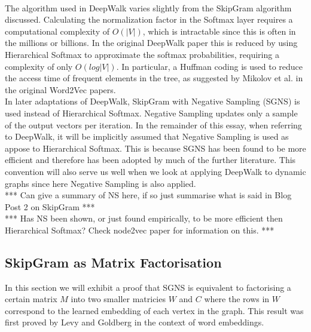 \documentclass[a4paper]{article}
\begin{document}
\\
The algorithm used in DeepWalk varies slightly from the SkipGram algorithm
discussed. Calculating the normalization factor in the Softmax layer requires a
computational complexity of $O(|V|)$, which is intractable since this is often
in the millions or billions. In the original DeepWalk paper this is
reduced by using Hierarchical Softmax to approximate the softmax probabilities,
requiring a complexity of only $O(log|V|)$. In particular, a Huffman coding is
used to reduce the access time of frequent elements in the tree, as suggested by
Mikolov et al. in the original Word2Vec
papers.\cite{mikolov2013efficient,mikolov2013distributed}\\
In later adaptations of DeepWalk, SkipGram with Negative Sampling (SGNS) is used instead of
Hierarchical Softmax. Negative Sampling updates only a sample of the output
vectors per iteration. In the remainder of this essay, when referring to DeepWalk, it will be
implicitly assumed that Negative Sampling is used as appose to Hierarchical
Softmax. This is because SGNS has been found to be more efficient
and therefore has been adopted by much of the further literature. This convention will also
serve us well when we look at applying DeepWalk to dynamic graphs since here
Negative Sampling is also applied.\\
*** Can give a summary of NS here, if so just summarise what is said in Blog
Post 2 on SkipGram ***\\
*** Has NS been shown, or just found empirically, to be more efficient then
Hierarchical Softmax? Check node2vec paper for information on this. ***\\
\subsection{SkipGram as Matrix Factorisation}
In this section we will exhibit a proof that SGNS is
equivalent to factorising a certain matrix $M$ into two smaller matricies $W$
and $C$ where the rows in $W$ correspond to the learned embedding of each vertex
in the graph. This result was first proved by Levy and
Goldberg\cite{levy&goldberg} in the context of word embeddings.\\
\end{document}
